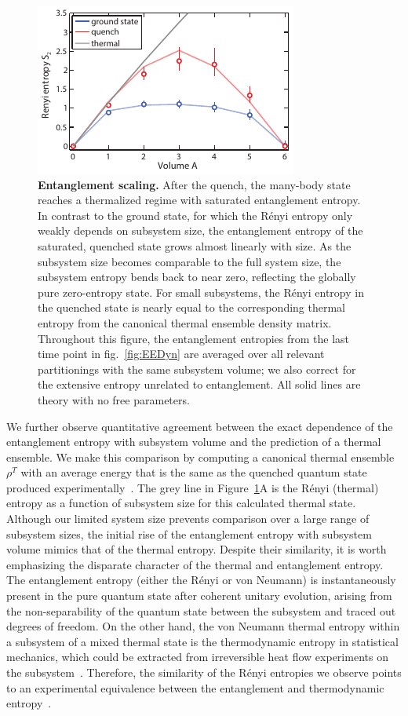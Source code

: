 \begin{figure}[t]
	\centering
	\includegraphics[scale=1.5]{figures/ETH_volumeLaw.pdf}
	\caption{{\bf Entanglement scaling. } After the quench, the many-body state reaches a thermalized regime with saturated entanglement entropy. In contrast to the ground state, for which the R\'{e}nyi entropy only weakly depends on subsystem size, the entanglement entropy of the saturated, quenched state grows almost linearly with size. As the subsystem size becomes comparable to the full system size, the subsystem entropy bends back to near zero, reflecting the globally pure zero-entropy state. For small subsystems, the R\'{e}nyi entropy in the quenched state is nearly equal to the corresponding thermal entropy from the canonical thermal ensemble density matrix. Throughout this figure, the entanglement entropies from the last time point in fig.~\ref{fig:EEDyn} are averaged over all relevant partitionings with the same subsystem volume; we also correct for the extensive entropy unrelated to entanglement. All solid lines are theory with no free parameters.}
	\label{fig:volume}
\end{figure}

We further observe quantitative agreement between the exact dependence of the entanglement entropy with subsystem volume and the prediction of a thermal ensemble. We make this comparison by computing a canonical thermal ensemble $\rho^T$ with an average energy that is the same as the quenched quantum state produced experimentally~\cite{Garrison2015}. The grey line in Figure~\ref{fig:volume}A is the R\'{e}nyi (thermal) entropy as a function of subsystem size for this calculated thermal state. Although our limited system size prevents comparison over a large range of subsystem sizes, the initial rise of the entanglement entropy with subsystem volume mimics that of the thermal entropy. Despite their similarity, it is worth emphasizing the disparate character of the thermal and entanglement entropy. The entanglement entropy (either the R\'{e}nyi or von Neumann) is instantaneously present in the pure quantum state after coherent unitary evolution, arising from the non-separability of the quantum state between the subsystem and traced out degrees of freedom. On the other hand, the von Neumann thermal entropy within a subsystem of a mixed thermal state is the thermodynamic entropy in statistical mechanics, which could be extracted from irreversible heat flow experiments on the subsystem~\cite{Deutsch2013}. Therefore, the similarity of the R\'{e}nyi  entropies we observe points to an experimental equivalence between the entanglement and thermodynamic entropy~\cite{Garrison2015,Grover2015}.

